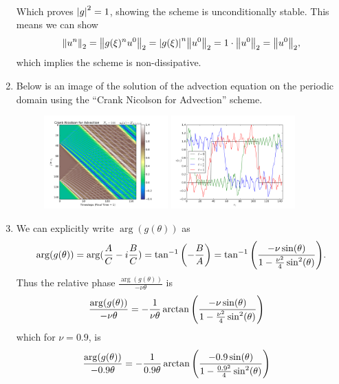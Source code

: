 \documentclass{article} %
\theoremstyle{plain}
\numberwithin{equation}{section} %
\numberwithin{figure}{section} %
\numberwithin{table}{section} %
\begin{document}
\begin{enumerate}[\ \ (a)]
\begin{align*}
        \end{align*}
        Which proves $\abs{g}^2 = 1$, showing the scheme is unconditionally stable.  This means we can show
        \begin{align*}
            \norm{u^n}_2 = \norm{g(\xi)^nu^0}_2 = \abs{g(\xi)}^n\norm{u^0}_2 = 1\cdot\norm{u^0}_2 = \norm{u^0}_2,
        \end{align*}
        which implies the scheme is non-dissipative.
    \item
        Below is an image of the solution of the advection equation on the periodic domain using the ``Crank Nicolson for Advection'' scheme.
        \begin{figure}[ht!]
            \centering
            \includegraphics[width=0.45\textwidth]{figures/CN_discon.png}
            \includegraphics[width=0.45\textwidth]{figures/CN_snapshots.png}
        \end{figure}
        \FloatBarrier
    \item
        We can explicitly write $\arg(g(\theta))$ as $$\arg(g(\theta)) = \arg(\frac{A}{C} - i\frac{B}{C}) = \tan^{-1}\qty(-\frac{B}{A}) = \tan^{-1}\qty(\frac{-\nu\sin(\theta)}{1 - \frac{\nu^2}{4}\sin^2(\theta)}).$$ Thus the relative phase $\frac{\arg(g(\theta))}{-\nu\theta}$ is
        \begin{align*}
            \frac{\arg(g(\theta))}{-\nu\theta} &= -\frac{1}{\nu\theta}\arctan\qty(\frac{-\nu\sin(\theta)}{1 - \frac{\nu^2}{4}\sin^2(\theta)})
        \end{align*}
        which for $\nu = 0.9$, is
        \begin{align*}
            \frac{\arg(g(\theta))}{-0.9\theta} &= -\frac{1}{0.9\theta}\arctan\qty(\frac{-0.9\sin(\theta)}{1 - \frac{0.9^2}{4}\sin^2(\theta)})

\end{align*}
\end{enumerate}
\end{document}
